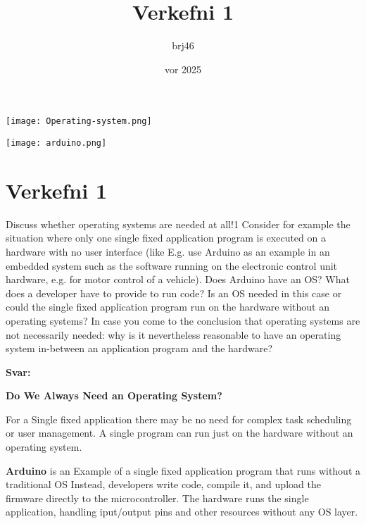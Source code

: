 \documentclass{article}
\title{Verkefni 1}
\author{brj46 }
\date{vor 2025}
\newcommand{\sv}{\textbf{Svar:}}
\newcommand{\bo}[1]{\textbf{#1}}
\begin{document}
\maketitle



\vspace{5em}

\begin{center}
    \texttt{[image: Operating-system.png]}
\end{center}

\vspace{3em}

\begin{center}
    \texttt{[image: arduino.png]}
\end{center}

\newpage

\section{Verkefni 1}

Discuss whether operating systems are needed at all!1 Consider for example the situation
where only one single fixed application program is executed on a hardware with no user
interface (like E.g. use Arduino as an example in an embedded system such as the software
running on the electronic control unit hardware, e.g. for motor control of a vehicle). Does
Arduino have an OS? What does a developer have to provide to run code? Is an OS needed
in this case or could the single fixed application program run on the hardware without an
operating systems?
In case you come to the conclusion that operating systems are not necessarily needed: why
is it nevertheless reasonable to have an operating system in-between an application program
and the hardware?

\sv

\bo{Do We Always Need an Operating System?}

For a Single fixed application there may be no need for complex task scheduling or user management.
A single program can run just on the hardware without an operating system.

\bo{Arduino} is an Example of a single fixed application program that runs without a traditional OS
Instead, developers write code, compile it, and upload the firmware directly to the microcontroller.
The hardware runs the single application, handling 
iput/output pins and other resources without any OS layer.
\end{document}
